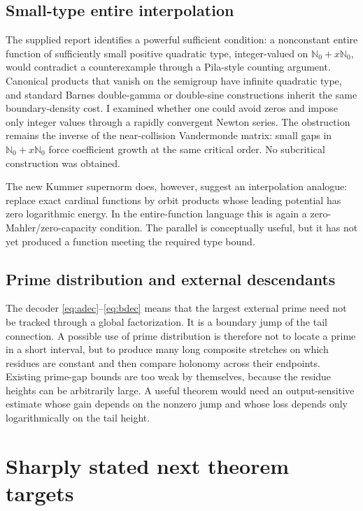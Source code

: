 \documentclass[11pt]{article}
\theoremstyle{definition}
\theoremstyle{remark}
\newcommand{\N}{\mathbb N}
\begin{document}
\subsection{Small-type entire interpolation}

The supplied report identifies a powerful sufficient condition: a nonconstant
entire function of sufficiently small positive quadratic type, integer-valued on
$\N_0+x\N_0$, would contradict a counterexample through a Pila-style counting
argument.  Canonical products that vanish on the semigroup have infinite
quadratic type, and standard Barnes double-gamma or double-sine constructions
inherit the same boundary-density cost.  I examined whether one could avoid
zeros and impose only integer values through a rapidly convergent Newton series.
The obstruction remains the inverse of the near-collision Vandermonde matrix:
small gaps in $\N_0+x\N_0$ force coefficient growth at the same critical order.
No subcritical construction was obtained.

The new Kummer supernorm does, however, suggest an interpolation analogue:
replace exact cardinal functions by orbit products whose leading potential has
zero logarithmic energy.  In the entire-function language this is again a
zero-Mahler/zero-capacity condition.  The parallel is conceptually useful, but it
has not yet produced a function meeting the required type bound.

\subsection{Prime distribution and external descendants}

The decoder \eqref{eq:adec}--\eqref{eq:bdec} means that the largest external
prime need not be tracked through a global factorization.  It is a boundary jump
of the tail connection.  A possible use of prime distribution is therefore not
to locate a prime in a short interval, but to produce many long composite
stretches on which residues are constant and then compare holonomy across their
endpoints.  Existing prime-gap bounds are too weak by themselves, because the
residue heights can be arbitrarily large.  A useful theorem would need an
output-sensitive estimate whose gain depends on the nonzero jump and whose loss
depends only logarithmically on the tail height.

\section{Sharply stated next theorem targets}
\end{document}
